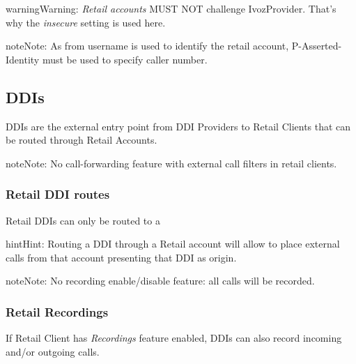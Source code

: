 \documentclass[letterpaper,10pt,english]{sphinxmanual}
\begin{document}
\begin{notice}{warning}{Warning:}
\emph{Retail accounts} MUST NOT challenge IvozProvider. That's
why the \emph{insecure} setting is used here.
\end{notice}

\begin{notice}{note}{Note:}
As from username is used to identify the retail account, P-Asserted-Identity must be used to specify caller number.
\end{notice}


\subsection{DDIs}
\label{administration_portal/client/retail/ddis:ddis}\label{administration_portal/client/retail/ddis::doc}\label{administration_portal/client/retail/ddis:retail-ddis}
DDIs are the external entry point from DDI Providers to Retail Clients that
can be routed through Retail Accounts.

\begin{notice}{note}{Note:}
No call-forwarding feature with external call filters in retail clients.
\end{notice}


\subsubsection{Retail DDI routes}
\label{administration_portal/client/retail/ddis:retail-ddi-routes}
Retail DDIs can only be routed to a {\hyperref[administration_portal/client/retail/retail_accounts:retail\string-accounts]{}}

\begin{notice}{hint}{Hint:}
Routing a DDI through a Retail account will allow to place external calls
from that account presenting that DDI as origin.
\end{notice}

\begin{notice}{note}{Note:}
No recording enable/disable feature: all calls will be recorded.
\end{notice}


\subsubsection{Retail Recordings}
\label{administration_portal/client/retail/ddis:retail-recordings}
If Retail Client has \emph{Recordings} feature enabled, DDIs can also record incoming and/or
outgoing calls.
\end{document}
